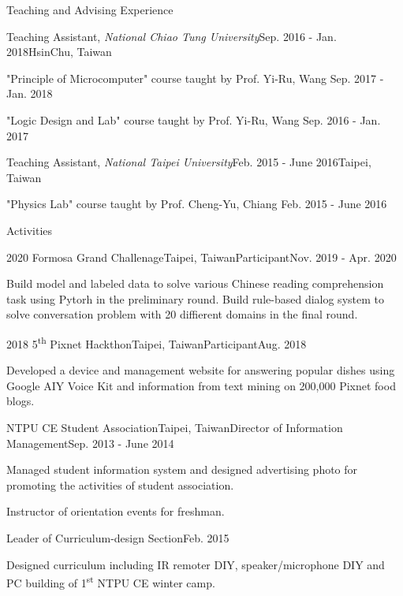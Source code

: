 \documentclass{resume} %
\newcommand{\ts}{\textsuperscript}
\begin{document}
\begin{rSection}{Teaching and Advising Experience}
    \begin{rSubsection}{Teaching Assistant, \it{National Chiao Tung University}}{Sep. 2016 - Jan. 2018}{}{HsinChu, Taiwan}
        \item "Principle of Microcomputer" course taught by Prof. Yi-Ru, Wang \hfill Sep. 2017 - Jan. 2018
        \item "Logic Design and Lab" course taught by Prof. Yi-Ru, Wang \hfill Sep. 2016 - Jan. 2017
    \end{rSubsection}
    \begin{rSubsection}{Teaching Assistant, \it{National Taipei University}}{Feb. 2015 - June 2016}{}{Taipei, Taiwan}
        \item "Physics Lab" course taught by Prof. Cheng-Yu, Chiang \hfill Feb. 2015 - June 2016
    \end{rSubsection}
\end{rSection}

\begin{rSection}{Activities}
    \begin{rSubsection}{2020 Formosa Grand Challenage}{Taipei, Taiwan}{Participant}{Nov. 2019 - Apr. 2020}
        \item Build model and labeled data to solve various Chinese reading comprehension task using Pytorh in the preliminary round. 
        Build rule-based dialog system to solve conversation problem with 20 diffierent domains in the final round.
    \end{rSubsection}
    \begin{rSubsection}{2018 5\ts{th} Pixnet Hackthon}{Taipei, Taiwan}{Participant}{Aug. 2018}
        \item Developed a device and management website for answering popular dishes using Google AIY Voice Kit and information from text mining on 200,000 Pixnet food blogs.
    \end{rSubsection}
    \begin{rSubsection}{NTPU CE Student Association}{Taipei, Taiwan}{Director of Information Management}{Sep. 2013 - June 2014}
        \item Managed student information system and designed advertising photo for promoting the activities of student association.
        \item Instructor of orientation events for freshman.
    \end{rSubsection}
    \begin{rSubsection2}{Leader of Curriculum-design Section}{Feb. 2015}
        \item Designed curriculum including IR remoter DIY, speaker/microphone DIY and PC building of 1\ts{st} NTPU CE winter camp.
    \end{rSubsection2}
\end{rSection}
\end{document}
